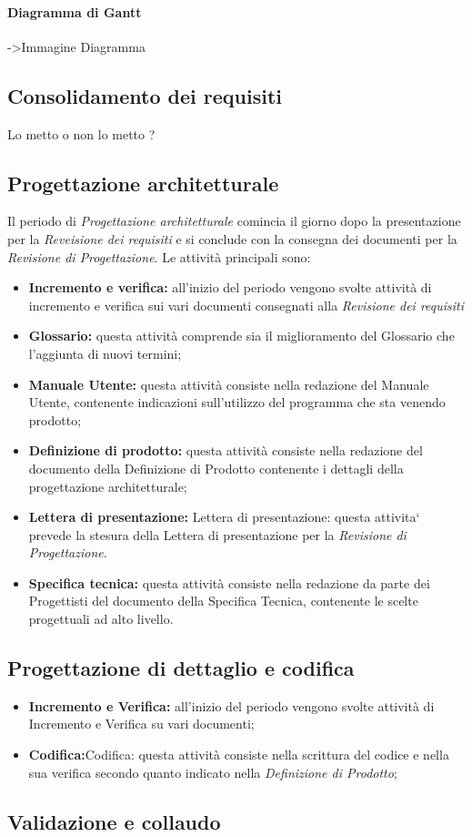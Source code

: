 \paragraph{Diagramma di Gantt}
->Immagine Diagramma
\subsection{Consolidamento dei requisiti}
Lo metto o non lo metto ?
\subsection{Progettazione architetturale}
Il periodo di \textit{Progettazione architetturale} comincia il giorno dopo la presentazione per la \textit{Reveisione dei requisiti} e si conclude con la consegna dei documenti per la \textit{Revisione di Progettazione}. Le attività principali sono:
\begin{itemize}
	\item{\textbf{Incremento e verifica:} all'inizio del periodo vengono svolte attività di incremento e verifica sui vari documenti consegnati alla \textit{Revisione dei requisiti}}
	\item{\textbf{Glossario:} questa attività comprende sia il miglioramento del Glossario che l’aggiunta di nuovi termini;}
	\item{\textbf{Manuale Utente:}  questa attività consiste nella redazione del Manuale Utente, contenente indicazioni sull’utilizzo del programma che sta venendo prodotto;}
	\item{\textbf{Definizione di prodotto:} questa attività consiste nella redazione del documento della Definizione di Prodotto contenente i dettagli della progettazione architetturale;}
	\item{\textbf{Lettera di presentazione:} Lettera di presentazione: questa attivita` prevede la stesura della Lettera di presentazione per la \textit{Revisione di Progettazione}.}
	\item{\textbf{Specifica tecnica:} questa attività consiste nella redazione da parte dei Progettisti del documento della Specifica Tecnica, contenente le scelte progettuali ad alto livello.}
\end{itemize}
\subsection{Progettazione di dettaglio e codifica} 
\begin{itemize}
	\item{\textbf{Incremento e Verifica:}  all’inizio del periodo vengono svolte attività di Incremento e Verifica su vari documenti;}
	\item{\textbf{Codifica:}Codifica: questa attività consiste nella scrittura del codice e nella sua verifica secondo quanto indicato nella \textit{Definizione di Prodotto};}
\end{itemize}
\subsection{Validazione e collaudo}

	